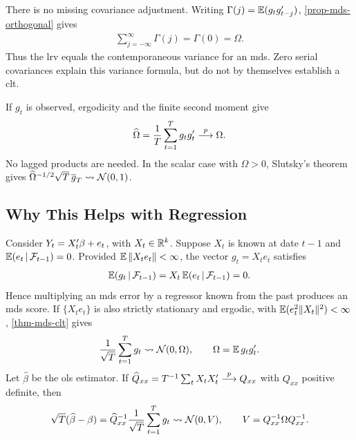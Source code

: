 \documentclass[a4paper,12pt]{article}
\begin{document}
\begin{remark}
	There is no missing covariance adjustment.
	Writing $\Gamma(j)=\operatorname{\mathbb{E}}(g_tg_{t-j}^{\prime})$, \autoref{prop-mds-orthogonal} gives
	\begin{align}
		\sum_{j=-\infty}^{\infty}\Gamma(j)=\Gamma(0)=\Omega.
	\end{align}
	Thus the \gls{lrv} equals the contemporaneous variance for an \gls{mds}.
	Zero serial covariances explain this variance formula, but do not by themselves establish a \gls{clt}.
\end{remark}

\begin{remark}
	If $g_t$ is observed, ergodicity and the finite second moment give
	\begin{align}
		\widehat\Omega=\frac1T\sum_{t=1}^Tg_tg_t^{\prime}\overset{p}{\longrightarrow}\Omega.
	\end{align}
	No lagged products are needed.
	In the scalar case with $\Omega>0$, Slutsky's theorem gives
	$\widehat\Omega^{-1/2}\sqrt T\,\overline g_T\overset{}{\leadsto}\operatorname{\mathcal{N}}(0,1)$.
\end{remark}

\subsection{Why This Helps with Regression}

Consider $Y_t=X_t^{\prime}\beta+e_t$, with $X_t\in\mathbb{R}^k$.
Suppose $X_t$ is known at date $t-1$ and $\operatorname{\mathbb{E}}(e_t\mathpunct{}|\mathpunct{}\mathcal F_{t-1})=0$.
Provided $\operatorname{\mathbb{E}}\|X_te_t\|<\infty$, the vector $g_t=X_te_t$ satisfies
\begin{align}\label{eq-score-mds}
	\operatorname{\mathbb{E}}(g_t\mathpunct{}|\mathpunct{}\mathcal F_{t-1})
	=X_t\operatorname{\mathbb{E}}(e_t\mathpunct{}|\mathpunct{}\mathcal F_{t-1})=0.
\end{align}
Hence multiplying an \gls{mds} error by a regressor known from the past produces an \gls{mds} score.
If $\{X_te_t\}$ is also strictly stationary and ergodic, with $\operatorname{\mathbb{E}}(e_t^2\|X_t\|^2)<\infty$,
\autoref{thm-mds-clt} gives
\begin{align}
	\frac1{\sqrt T}\sum_{t=1}^T g_t\overset{}{\leadsto}\operatorname{\mathcal{N}}(0,\Omega),
	\qquad \Omega=\operatorname{\mathbb{E}} g_t g_t^{\prime}.
\end{align}
Let $\widehat\beta$ be the \gls{ols} estimator.
If $\widehat Q_{xx}=T^{-1}\sum_tX_tX_t^{\prime}\overset{p}{\longrightarrow} Q_{xx}$ with $Q_{xx}$ positive definite, then
\begin{align}
	\sqrt T(\widehat\beta-\beta)
	=\widehat Q_{xx}^{-1}\frac1{\sqrt T}\sum_{t=1}^T g_t
	\overset{}{\leadsto}\operatorname{\mathcal{N}}(0,V),\qquad
	V=Q_{xx}^{-1}\Omega Q_{xx}^{-1}.
\end{align}
\end{document}
